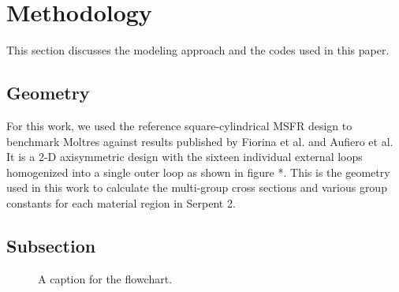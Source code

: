 \section{Methodology}

This section discusses the modeling approach and the codes used in this paper.

\subsection{Geometry}

For this work, we used the reference square-cylindrical \gls{MSFR} design to
benchmark Moltres against results published by Fiorina et al. and Aufiero et
al. It is a 2-D axisymmetric design with the sixteen individual external loops
homogenized into a single outer loop as shown in figure *. This is the geometry
used in this work to calculate the multi-group cross sections and various
group constants for each material region in Serpent 2. 

\subsection{Subsection}

\begin{figure}[h]
        \centering
{}
\caption{A caption for the flowchart.}
\label{fig:comp}
\end{figure}

